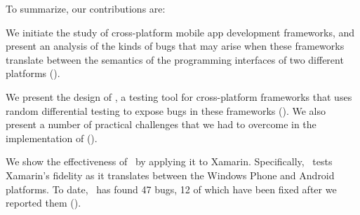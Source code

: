 
To summarize, our contributions are:
\begin{mybullet}

\item We initiate the study of cross-platform mobile app development
frameworks, and present an analysis of the kinds of bugs that may arise when
these frameworks translate between the semantics of the programming interfaces
of two different platforms ().

\item We present the design of \tool, a testing tool for cross-platform
frameworks that uses random differential testing to expose bugs in these
frameworks (). We also present a number of practical
challenges that we had to overcome in the implementation of \tool
().

\item We show the effectiveness of \tool\ by applying it to Xamarin.
Specifically, \tool\ tests Xamarin's fidelity as it translates between the
Windows Phone and Android platforms. To date, \tool\ has found 47 bugs, 12 of
which have been fixed after we reported them ().

\end{mybullet}
